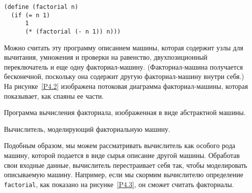 \begin{Verbatim}[fontsize=\small]
(define (factorial n)
  (if (= n 1)
      1
      (* (factorial (- n 1)) n)))
\end{Verbatim}
Можно считать эту программу описанием машины, которая
содержит узлы для вычитания, умножения и проверки на равенство,
двухпозиционный переключатель и еще одну факториал-машину.
(Факториал-машина получается бесконечной, поскольку она содержит
другую факториал-машину внутри себя.)  На 
рисунке~\ref{P4.2} изображена потоковая диаграмма факториал-машины,
которая показывает, как спаяны ее части.


\begin{cntrfig}

\caption{Программа вычисления факториала,
изображенная в виде абстрактной машины.}
\label{P4.2}%
\end{cntrfig}


\begin{cntrfig}

\caption{Вычислитель, моделирующий факториальную
машину.}
\label{P4.3}%

\end{cntrfig}

Подобным образом, мы можем рассматривать вычислитель как
особого рода машину, 
которой подается в виде сырья описание другой машины.
Обработав свои входные данные, вычислитель перестраивает себя так,
чтобы моделировать описываемую машину.  Например, если мы скормим
вычислителю определение {\tt factorial}, как показано на
рисунке~\ref{P4.3}, он сможет считать
факториалы.

